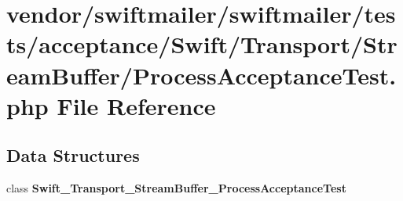 \section{vendor/swiftmailer/swiftmailer/tests/acceptance/\+Swift/\+Transport/\+Stream\+Buffer/\+Process\+Acceptance\+Test.php File Reference}
\label{_process_acceptance_test_8php}
\subsection*{Data Structures}
\begin{DoxyCompactItemize}
\item 
class {\bf Swift\+\_\+\+Transport\+\_\+\+Stream\+Buffer\+\_\+\+Process\+Acceptance\+Test}
\end{DoxyCompactItemize}
